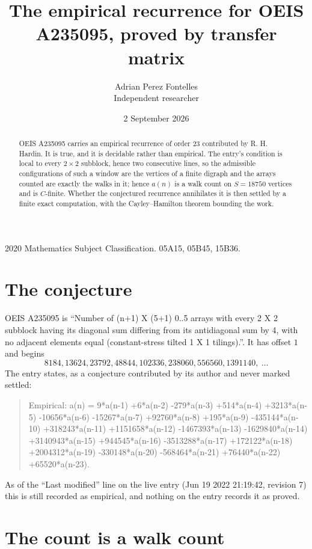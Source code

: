 \documentclass[11pt,a4paper]{article}
\title{The empirical recurrence for OEIS A235095, proved by transfer matrix}
\author{Adrian Perez Fontelles\\ \small Independent researcher}
\date{2 September 2026}
\theoremstyle{plain}
\theoremstyle{definition}
\begin{document}
\maketitle

\begin{abstract}
OEIS A235095 carries an empirical recurrence of order $23$ contributed by R. H. Hardin. It is
true, and it is decidable rather than empirical. The entry's condition is local to every $2\times2$ subblock, hence two consecutive lines, so
the admissible configurations of such a window are the vertices of a finite digraph and the
arrays counted are exactly the walks in it; hence $a(n)$ is a walk count on $S=18750$ vertices
and is $C$-finite. Whether the conjectured recurrence annihilates it is then settled by a
finite exact computation, with the Cayley--Hamilton theorem bounding the work.
\end{abstract}

\noindent\small 2020 Mathematics Subject Classification. 05A15, 05B45, 15B36.\normalsize

\section{The conjecture}

OEIS A235095 is ``Number of (n+1) X (5+1) 0..5 arrays with every 2 X 2 subblock having its diagonal sum differing from its antidiagonal sum by 4, with no adjacent elements equal (constant-stress tilted 1 X 1 tilings).''. It has offset $1$ and begins
\[
8184, 13624, 23792, 48844, 102336, 238060, 556560, 1391140,\ \dots
\]
The entry states, as a conjecture contributed by its author and never marked settled:
\begin{quote}
Empirical: a(n) = 9*a(n-1) +6*a(n-2) -279*a(n-3) +514*a(n-4) +3213*a(n-5) -10656*a(n-6) -15267*a(n-7) +92760*a(n-8) +195*a(n-9) -435144*a(n-10) +318243*a(n-11) +1151658*a(n-12) -1467393*a(n-13) -1629840*a(n-14) +3140943*a(n-15) +944545*a(n-16) -3513288*a(n-17) +172122*a(n-18) +2004312*a(n-19) -330148*a(n-20) -568464*a(n-21) +76440*a(n-22) +65520*a(n-23).
\end{quote}
As of the ``Last modified'' line on the live entry (Jun 19 2022 21:19:42, revision 7) this is still
recorded as empirical, and nothing on the entry records it as proved.

\section{The count is a walk count}
\end{document}
